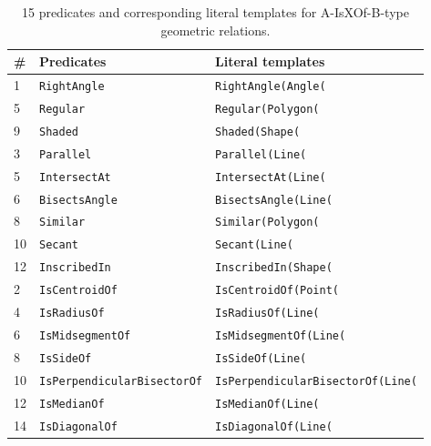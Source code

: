 \documentclass[11pt,a4paper]{article}
\begin{document}
\begin{table*}[ht]
\footnotesize
\centering 
\begin{tabular}{lll}
	\toprule
	\# & \textbf{Predicates} & \textbf{Literal templates} \\
	\midrule
	1 & \texttt{RightAngle} & \texttt{RightAngle(Angle(}\\
	5 & \texttt{Regular} & \texttt{Regular(Polygon(}\\
	9 & \texttt{Shaded} & \texttt{Shaded(Shape(}\\
	3 & \texttt{Parallel} & \texttt{Parallel(Line(}\\
	5 & \texttt{IntersectAt} & \texttt{IntersectAt(Line(}\\
	6 & \texttt{BisectsAngle} & \texttt{BisectsAngle(Line(}\\
	8 & \texttt{Similar} & \texttt{Similar(Polygon(}\\
    10 & \texttt{Secant} & \texttt{Secant(Line(}\\
    12 & \texttt{InscribedIn} & \texttt{InscribedIn(Shape(}\\
	2 &\texttt{IsCentroidOf} & \texttt{IsCentroidOf(Point(}\\
	4 &\texttt{IsRadiusOf} & \texttt{IsRadiusOf(Line(}\\
	6 & \texttt{IsMidsegmentOf} & \texttt{IsMidsegmentOf(Line(}\\
	8 &	\texttt{IsSideOf} & \texttt{IsSideOf(Line(}\\
    10 & \texttt{IsPerpendicularBisectorOf}	& \texttt{IsPerpendicularBisectorOf(Line(}\\
    12 & \texttt{IsMedianOf} & \texttt{IsMedianOf(Line(}\\
	14 & \texttt{IsDiagonalOf} & \texttt{IsDiagonalOf(Line(}\\
	\bottomrule
\end{tabular}
\caption{15 predicates and corresponding literal templates for A-IsXOf-B-type geometric relations.}
\label{appex:predicate5}
\end{table*}
\end{document}

